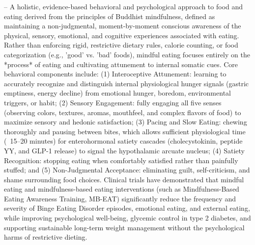 -- A holistic, evidence-based behavioral and psychological approach to food and eating derived from the principles of Buddhist mindfulness, defined as maintaining a non-judgmental, moment-by-moment conscious awareness of the physical, sensory, emotional, and cognitive experiences associated with eating. Rather than enforcing rigid, restrictive dietary rules, calorie counting, or food categorization (e.g., 'good' vs. 'bad' foods), mindful eating focuses entirely on the *process* of eating and cultivating attunement to internal somatic cues. Core behavioral components include: (1) Interoceptive Attunement: learning to accurately recognize and distinguish internal physiological hunger signals (gastric emptiness, energy decline) from emotional hunger, boredom, environmental triggers, or habit; (2) Sensory Engagement: fully engaging all five senses (observing colors, textures, aromas, mouthfeel, and complex flavors of food) to maximize sensory and hedonic satisfaction; (3) Pacing and Slow Eating: chewing thoroughly and pausing between bites, which allows sufficient physiological time (~15--20 minutes) for enterohormonal satiety cascades (cholecystokinin, peptide YY, and GLP-1 release) to signal the hypothalamic arcuate nucleus; (4) Satiety Recognition: stopping eating when comfortably satisfied rather than painfully stuffed; and (5) Non-Judgmental Acceptance: eliminating guilt, self-criticism, and shame surrounding food choices. Clinical trials have demonstrated that mindful eating and mindfulness-based eating interventions (such as Mindfulness-Based Eating Awareness Training, MB-EAT) significantly reduce the frequency and severity of Binge Eating Disorder episodes, emotional eating, and external eating, while improving psychological well-being, glycemic control in type 2 diabetes, and supporting sustainable long-term weight management without the psychological harms of restrictive dieting.

